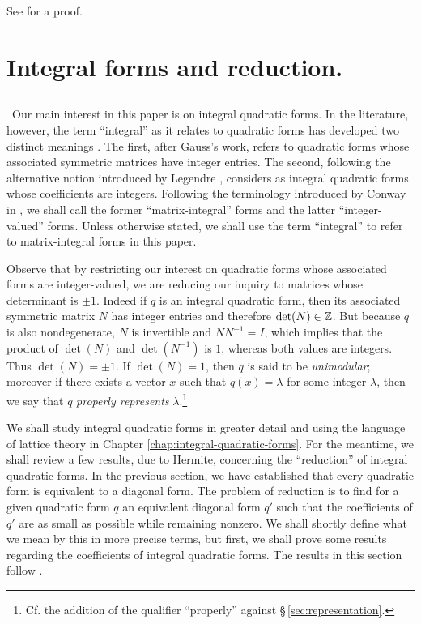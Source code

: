 See \cite[pp.~30--31]{serre2012course} for a proof.

\section{Integral forms and reduction.}

\subsection{}~Our main interest in this paper is on integral quadratic forms. In
the literature, however, the term ``integral'' as it relates to quadratic forms
has developed two distinct meanings \cite{conway1999universal,
conway1997sensual}. The first, after Gauss's work, refers to quadratic forms
whose associated symmetric matrices have integer entries. The second, following
the alternative notion introduced by Legendre \cite{legendre1808essai},
considers as integral quadratic forms whose coefficients are integers. Following
the terminology introduced by Conway in \cite{conway1997sensual}, we shall call
the former ``matrix-integral'' forms and the latter ``integer-valued'' forms.
Unless otherwise stated, we shall use the term ``integral'' to refer to
matrix-integral forms in this paper. \label{sec:integral-forms-def}

Observe that by restricting our interest on quadratic forms whose associated
forms are integer-valued, we are reducing our inquiry to matrices whose
determinant is \(\pm 1\). Indeed if \(q\) is an integral quadratic form, then
its associated symmetric matrix \(N\) has integer entries and therefore
\(\det(N) \in \mathbb{Z}\). But because \(q\) is also nondegenerate, \(N\) is
invertible and \(NN^{-1} = I\), which implies that the product of \(\det(N)\)
and \(\det(N^{-1})\) is \(1\), whereas both values are integers. Thus \(\det(N)
= \pm 1\). If \(\det(N) = 1\), then \(q\) is said to be \emph{unimodular};
moreover if there exists a vector \(x\) such that \(q(x) = \lambda\) for some
integer \(\lambda\), then we say that \(q\) \emph{properly represents}
\(\lambda\).\footnote{Cf. the addition of the qualifier ``properly'' against
\S\,\ref{sec:representation}.}

We shall study integral quadratic forms in greater detail and using the language
of lattice theory in Chapter \ref{chap:integral-quadratic-forms}. For the
meantime, we shall review a few results, due to Hermite, concerning the
``reduction'' of integral quadratic forms. In the previous section, we have
established that every quadratic form is equivalent to a diagonal form. The
problem of reduction is to find for a given quadratic form \(q\) an equivalent
diagonal form \(q'\) such that the coefficients of \(q'\) are as small as
possible while remaining nonzero. We shall shortly define what we mean by this
in more precise terms, but first, we shall prove some results regarding the
coefficients of integral quadratic forms. The results in this section follow
\cite{cassels2008rational,jones1950arithmetic,
watson1960integral}.\label{sec:reduction}

